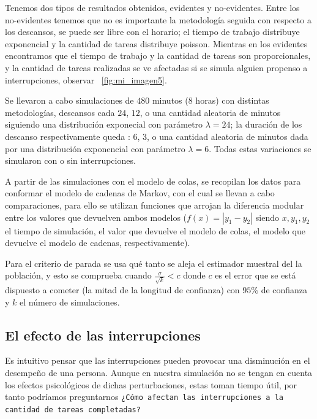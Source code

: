\documentclass[10pt,a4paper,twocolumn]{article}
\begin{document}
Tenemos dos tipos de resultados obtenidos, evidentes y no-evidentes. Entre los no-evidentes tenemos que no es importante la metodología seguida con respecto a los descansos, se puede ser libre con el horario; el tiempo de trabajo distribuye exponencial y la cantidad de tareas distribuye poisson. Mientras en los evidentes encontramos que el tiempo de trabajo y la cantidad de tareas son proporcionales, y la cantidad de tareas realizadas se ve afectadas si se simula alguien propenso a interrupciones, observar ~\ref{fig:mi_imagen5}.

Se llevaron a cabo simulaciones de $480$ minutos ($8$ horas) con distintas metodologías, descansos cada $24$, $12$, o una cantidad aleatoria de minutos siguiendo una distribuci\'on exponecial con par\'ametro $\lambda = 24$; la duración de los descanso respectivamente queda : $6$, $3$, o una  cantidad aleatoria de minutos dada por una distribuci\'on exponencial con par\'ametro $\lambda = 6$. Todas estas variaciones se simularon con o sin interrupciones. 

A partir de las simulaciones con el modelo de colas, se recopilan los datos para conformar el modelo de cadenas de Markov, con el cual se llevan a cabo comparaciones, para ello se utilizan funciones que arrojan la diferencia modular entre los valores que devuelven ambos modelos ($f(x) = |y_1 - y_2|$ siendo $x,y_1,y_2$ el tiempo de simulaci\'on, el valor que devuelve el modelo de colas, el modelo que devuelve el modelo de cadenas, respectivamente). 

Para el criterio de parada se usa qu\'e tanto se aleja el estimador muestral del la poblaci\'on, y esto se comprueba cuando $\frac{\sigma}{\sqrt{k}} < c$ donde $c$ es el error que se est\'a dispuesto a cometer (la mitad de la longitud de confianza) con $95\%$ de confianza y $k$ el n\'umero de simulaciones. 

\subsection{El efecto de las interrupciones}

Es intuitivo pensar que las interrupciones pueden provocar una disminuci\'on en el desempeño de una persona. Aunque en nuestra simulación no se tengan en cuenta los efectos psicológicos de dichas perturbaciones, estas toman tiempo útil, por tanto podríamos preguntarnos \texttt{¿Cómo afectan las interrupciones a la cantidad de tareas completadas?}
\end{document}
